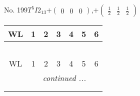 \documentclass[fleqn,9pt,landscape]{jsarticle}
\begin{document}
\begin{center}
\begin{longtable}{ccccccc}
\end{longtable}
\end{center}
\newpage
No. 199\quad$T_{}^{5}$\quad$I2_13$\quad[ cubic ]\quad$+\begin{pmatrix} 0 & 0 & 0 \end{pmatrix}$,\quad $+\begin{pmatrix} \frac{1}{2} & \frac{1}{2} & \frac{1}{2} \end{pmatrix}$
\begin{center}
\renewcommand{\arraystretch}{1.2}
\begin{longtable}{ccccccc}
 \hline \hline
WL & 1 & 2 & 3 & 4 & 5 & 6 \\ \hline \endfirsthead

\multicolumn{6}{l}{\tablename\ \thetable{}} \\
 \hline \hline
WL & 1 & 2 & 3 & 4 & 5 & 6 \\ \hline \endhead

 \hline \hline
\multicolumn{6}{r}{\footnotesize\it continued ...} \\ \endfoot

 \hline \hline
\multicolumn{6}{r}{} \\ \endlastfoot


\end{longtable}
\end{center}
\end{document}
